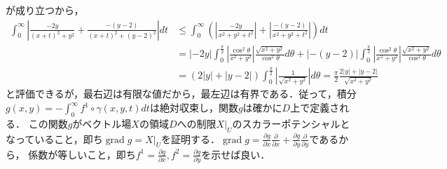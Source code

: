 \documentclass[dvipdfmx,a4paper,uplatex]{jsarticle}
\DeclareMathOperator{\grad}{\mathrm{grad}}
\begin{document}
が成り立つから，
\begin{align*}
    \int^\infty_0 \left| \frac{-2y}{(x+t)^2+y^2} + \frac{-(y-2)}{(x+t)^2+(y-2)^2} \right|dt &\le \int^\infty_0 \left(\left| \frac{-2y}{x^2+y^2+t^2} \right| + \left| \frac{-(y-2)}{x^2+y^2+t^2} \right|\right)dt \\
    &= |-2y|\int^{\frac{\pi}{2}}_0 \left| \frac{\cos^2\theta}{x^2+y^2} \right|\frac{\sqrt{x^2+y^2}}{\cos^2\theta}d\theta + |-(y-2)| \int^{\frac{\pi}{2}}_0 \left| \frac{\cos^2\theta}{x^2+y^2} \right|\frac{\sqrt{x^2+y^2}}{\cos^2\theta}d\theta\\
    &= (2|y|+|y-2|)\int^{\frac{\pi}{2}}_0\left| \frac{1}{\sqrt{x^2+y^2}} \right|d\theta = \frac{\pi}{2}\frac{2|y|+|y-2|}{\sqrt{x^2+y^2}}
\end{align*}
と評価できるが，最右辺は有限な値だから，最左辺は有界である．従って，積分$g(x,y)=-\int^\infty_0f^1\circ\gamma(x,y,t) dt$は絶対収束し，関数$g$は確かに$D$上で定義される．
この関数$g$がベクトル場$X$の領域$D$への制限$X|_U$のスカラーポテンシャルとなっていること，即ち$\grad g = X|_U$を証明する．$\grad g=\frac{\partial g}{\partial x}\frac{\partial}{\partial x} + \frac{\partial g}{\partial y}\frac{\partial}{\partial y}$であるから，
係数が等しいこと，即ち$f^1=\frac{\partial g}{\partial x},f^2=\frac{\partial g}{\partial y}$を示せば良い．
\end{document}
